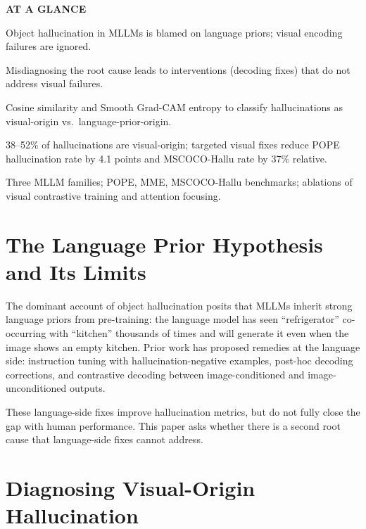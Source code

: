 \documentclass[10pt,twocolumn]{article}
\begin{document}
\begin{mdframed}[backgroundcolor=boxgray,linecolor=rulered,linewidth=1pt,
    innerleftmargin=6pt,innerrightmargin=6pt,
    innertopmargin=6pt,innerbottommargin=6pt]
\textbf{\small AT A GLANCE}\par\vspace{4pt}
\begin{description}[leftmargin=0pt,labelsep=4pt,itemsep=2pt,parsep=0pt,
    font=\small\bfseries]
  \item[Problem:] Object hallucination in MLLMs is blamed on language
    priors; visual encoding failures are ignored.
  \item[Why it matters:] Misdiagnosing the root cause leads to
    interventions (decoding fixes) that do not address visual failures.
  \item[Method:] Cosine similarity and Smooth Grad-CAM entropy to
    classify hallucinations as visual-origin vs.\ language-prior-origin.
  \item[Result:] 38--52\% of hallucinations are visual-origin; targeted
    visual fixes reduce POPE hallucination rate by 4.1 points and
    MSCOCO-Hallu rate by 37\% relative.
  \item[Evidence:] Three MLLM families; POPE, MME, MSCOCO-Hallu
    benchmarks; ablations of visual contrastive training and attention
    focusing.
\end{description}
\end{mdframed}

\section{The Language Prior Hypothesis and Its Limits}

The dominant account of object hallucination posits that MLLMs inherit
strong language priors from pre-training: the language model has seen
``refrigerator'' co-occurring with ``kitchen'' thousands of times and
will generate it even when the image shows an empty kitchen. Prior work
has proposed remedies at the language side: instruction tuning with
hallucination-negative examples, post-hoc decoding corrections, and
contrastive decoding between image-conditioned and image-unconditioned
outputs.

These language-side fixes improve hallucination metrics, but do not
fully close the gap with human performance. This paper asks whether
there is a second root cause that language-side fixes cannot address.

\section{Diagnosing Visual-Origin Hallucination}
\end{document}
